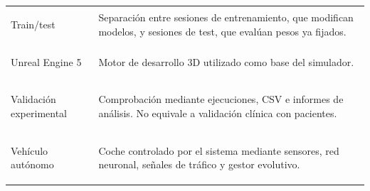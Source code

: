 \begin{longtable}{>{\bfseries\raggedright\arraybackslash}p{3.4cm}L{10.6cm}}
Train/test & Separación entre sesiones de entrenamiento, que modifican modelos, y sesiones de test, que evalúan pesos ya fijados.\\
Unreal Engine 5 & Motor de desarrollo 3D utilizado como base del simulador.\\
Validación experimental & Comprobación mediante ejecuciones, CSV e informes de análisis. No equivale a validación clínica con pacientes.\\
Vehículo autónomo & Coche controlado por el sistema mediante sensores, red neuronal, señales de tráfico y gestor evolutivo.\\
\end{longtable}
